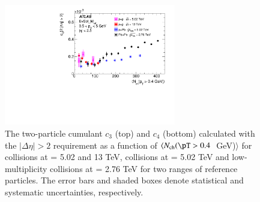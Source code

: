 \documentclass[cernpreprint,texlive=2014,txfonts,UKenglish]{latex/atlasdoc}
\begin{document}
\begin{figure}[ht!]
\begin{center}
\includegraphics[width=75mm]{fig_12d.pdf}
\caption{The two-particle cumulant $c_3$ (top) and $c_4$ (bottom) calculated with the $|\Delta\eta|>2$ requirement as a function of $\langle N_{\mathrm{ch}}(\pT > 0.4$~GeV)$\rangle$  for \pp collisions at \sqs= 5.02 and 13 TeV, \pPb collisions at \sqn= 5.02 TeV and low-multiplicity \PbPb collisions at \sqn= 2.76 TeV for two \pT ranges of reference particles. The error bars and shaded boxes denote statistical and systematic uncertainties, respectively.}
\label{fig:c3c4} 
\end{center}
\end{figure} 
\end{document}
